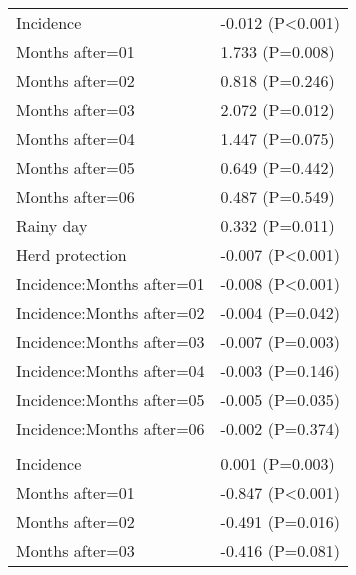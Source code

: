 \documentclass[]{article}
\begin{document}
\begin{longtable}[t]{ll}
\hspace{1em}Incidence & -0.012 (P<0.001)\\
\hspace{1em}Months after=01 & 1.733 (P=0.008)\\
\hspace{1em}Months after=02 & 0.818 (P=0.246)\\
\hspace{1em}Months after=03 & 2.072 (P=0.012)\\
\hspace{1em}Months after=04 & 1.447 (P=0.075)\\
\hspace{1em}Months after=05 & 0.649 (P=0.442)\\
\hspace{1em}Months after=06 & 0.487 (P=0.549)\\
\hspace{1em}Rainy day & 0.332 (P=0.011)\\
\hspace{1em}Herd protection & -0.007 (P<0.001)\\
\hspace{1em}Incidence:Months after=01 & -0.008 (P<0.001)\\
\hspace{1em}Incidence:Months after=02 & -0.004 (P=0.042)\\
\hspace{1em}Incidence:Months after=03 & -0.007 (P=0.003)\\
\hspace{1em}Incidence:Months after=04 & -0.003 (P=0.146)\\
\hspace{1em}Incidence:Months after=05 & -0.005 (P=0.035)\\
\hspace{1em}Incidence:Months after=06 & -0.002 (P=0.374)\\
\addlinespace[1.5em]
\multicolumn{2}{l}{\textbf{Temporary field worker}}\\
\hspace{1em}Incidence & 0.001 (P=0.003)\\
\hspace{1em}Months after=01 & -0.847 (P<0.001)\\
\hspace{1em}Months after=02 & -0.491 (P=0.016)\\
\hspace{1em}Months after=03 & -0.416 (P=0.081)\\

\end{longtable}
\end{document}
